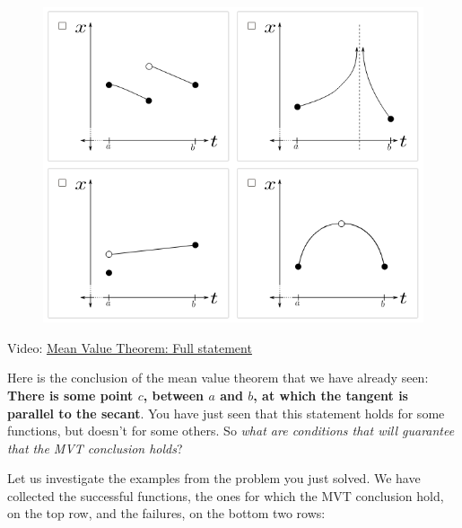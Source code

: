 \documentclass[pdftex, brazil, 12pt, twoside]{article}
\begin{document}
\begin{Exercise}[title={How the Mean Value Theorem can go wrong}]
\begin{figure}[H]
\begin{center}
    \end{center}
  \end{figure}
  \begin{figure}[H]
    \begin{center}
      \label{fig:mvt-hypot-3}
      \includegraphics[scale=0.4]{imagens/unit-1/u1-m1-00014.png}
    \end{center}
  \end{figure}
\end{Exercise}

Video: \href{https://www.youtube.com/watch?v=WmAcRkkoqOA}{Mean Value Theorem: Full statement}

Here is the conclusion of the mean value theorem
that we have already seen: 
\textbf{There is some point $c$, between $a$ and $b$, at which the tangent is
parallel to the secant}. You have just seen that this statement
holds for some functions, but doesn't for some others.
So \emph{what are conditions that will guarantee
that the MVT conclusion holds}?

Let us investigate the examples from the problem you just
solved.
We have collected the successful functions,
the ones for which the MVT conclusion hold,
on the top row, and the failures,
on the bottom two rows:
\end{document}
